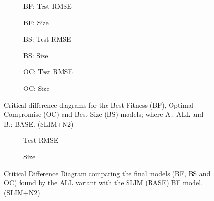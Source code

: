 \documentclass[11pt]{article}
\begin{document}
\begin{figure}[t]
\centering
\begin{subfigure}{0.48\textwidth}
\centering
\resizebox{\linewidth}{!}{}
\caption{BF: Test RMSE}
\end{subfigure}
\hfill
\begin{subfigure}{0.48\textwidth}
\centering
\resizebox{\linewidth}{!}{}
\caption{BF: Size}
\end{subfigure}
\vspace{1.5em}
\begin{subfigure}{0.48\textwidth}
\centering
\resizebox{\linewidth}{!}{}
\caption{BS: Test RMSE}
\end{subfigure}
\hfill
\begin{subfigure}{0.48\textwidth}
\centering
\resizebox{\linewidth}{!}{}
\caption{BS: Size}
\end{subfigure}
\vspace{1.5em}
\begin{subfigure}{0.48\textwidth}
\centering
\resizebox{\linewidth}{!}{}
\caption{OC: Test RMSE}
\end{subfigure}
\hfill
\begin{subfigure}{0.48\textwidth}
\centering
\resizebox{\linewidth}{!}{}
\caption{OC: Size}
\end{subfigure}
\caption{Critical difference diagrams for the Best Fitness (BF), Optimal Compromise (OC) and Best Size (BS) models; where A.: ALL and B.: BASE. (SLIM+N2)}
\end{figure}

\begin{figure}[t]
\centering
\begin{subfigure}{0.48\textwidth}
\centering
\resizebox{\linewidth}{!}{}
\caption{Test RMSE}
\end{subfigure}
\hfill
\begin{subfigure}{0.48\textwidth}
\centering
\resizebox{\linewidth}{!}{}
\caption{Size}
\end{subfigure}
\caption{Critical Difference Diagram comparing the final models (BF, BS and OC) found by the ALL variant with the SLIM (BASE) BF model. (SLIM+N2)}
\end{figure}
\end{document}
